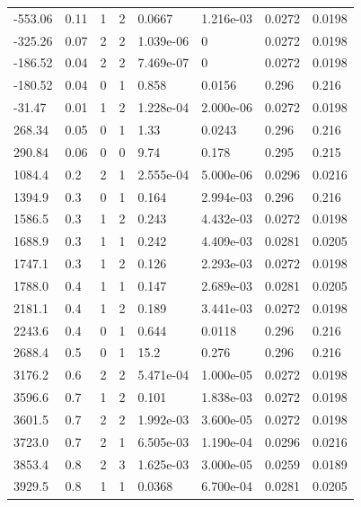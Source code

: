 \documentclass[preview]{standalone}
\begin{document}
{{\begin{tabular}{L{1.2cm}C{1.2cm} C{0.3cm}C{0.5cm} C{1.4cm}C{1.4cm} C{1.4cm}C{1.4cm}}
  -553.06  &  0.11  & 1     &  2 &  0.0667  & 1.216e-03  & 0.0272 &  0.0198   \\ 
  -325.26  &  0.07  & 2     &  2 &  1.039e-06  & 0  & 0.0272 &  0.0198   \\ 
  -186.52  &  0.04  & 2     &  2 &  7.469e-07  & 0  & 0.0272 &  0.0198   \\ 
  -180.52  &  0.04  & 0     &  1 &  0.858  & 0.0156  & 0.296 &  0.216   \\ 
  -31.47  &  0.01  & 1     &  2 &  1.228e-04  & 2.000e-06  & 0.0272 &  0.0198   \\ 
  268.34  &  0.05  & 0     &  1 &  1.33  & 0.0243  & 0.296 &  0.216   \\ 
  290.84  &  0.06  & 0     &  0 &  9.74  & 0.178  & 0.295 &  0.215   \\ 
  1084.4  &   0.2  & 2     &  1 &  2.555e-04  & 5.000e-06  & 0.0296 &  0.0216   \\ 
  1394.9  &   0.3  & 0     &  1 &  0.164  & 2.994e-03  & 0.296 &  0.216   \\ 
  1586.5  &   0.3  & 1     &  2 &  0.243  & 4.432e-03  & 0.0272 &  0.0198   \\ 
  1688.9  &   0.3  & 1     &  1 &  0.242  & 4.409e-03  & 0.0281 &  0.0205   \\ 
  1747.1  &   0.3  & 1     &  2 &  0.126  & 2.293e-03  & 0.0272 &  0.0198   \\ 
  1788.0  &   0.4  & 1     &  1 &  0.147  & 2.689e-03  & 0.0281 &  0.0205   \\ 
  2181.1  &   0.4  & 1     &  2 &  0.189  & 3.441e-03  & 0.0272 &  0.0198   \\ 
  2243.6  &   0.4  & 0     &  1 &  0.644  & 0.0118  & 0.296 &  0.216   \\ 
  2688.4  &   0.5  & 0     &  1 &  15.2  & 0.276  & 0.296 &  0.216   \\ 
  3176.2  &   0.6  & 2     &  2 &  5.471e-04  & 1.000e-05  & 0.0272 &  0.0198   \\ 
  3596.6  &   0.7  & 1     &  2 &  0.101  & 1.838e-03  & 0.0272 &  0.0198   \\ 
  3601.5  &   0.7  & 2     &  2 &  1.992e-03  & 3.600e-05  & 0.0272 &  0.0198   \\ 
  3723.0  &   0.7  & 2     &  1 &  6.505e-03  & 1.190e-04  & 0.0296 &  0.0216   \\ 
  3853.4  &   0.8  & 2     &  3 &  1.625e-03  & 3.000e-05  & 0.0259 &  0.0189   \\ 
  3929.5  &   0.8  & 1     &  1 &  0.0368  & 6.700e-04  & 0.0281 &  0.0205   \\ 

\end{tabular}}}
\end{document}
